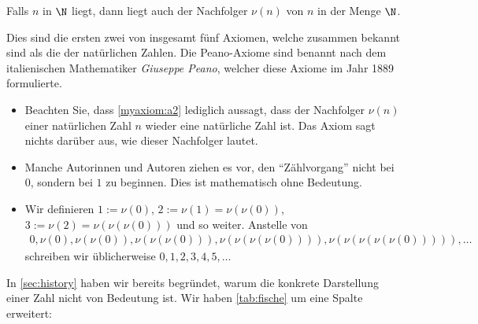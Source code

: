 \begin{myaxiom}\label{myaxiom:a2}
	Falls $n$ in $\N$ liegt, dann liegt auch der Nachfolger $\nu(n)$ von $n$ in der Menge $\N$.
\end{myaxiom}

\noindent
Dies sind die ersten zwei von insgesamt fünf Axiomen, welche zusammen bekannt sind als die  der natürlichen Zahlen. Die Peano-Axiome sind benannt nach dem italienischen Mathematiker \textit{Giuseppe Peano}, welcher diese Axiome im Jahr 1889 formulierte.

\begin{myremark}
  \leavevmode
	\begin{itemize}
		\item Beachten Sie, dass \cref{myaxiom:a2} lediglich aussagt, dass der Nachfolger $\nu(n)$ einer natürlichen Zahl $n$ wieder eine natürliche Zahl ist. Das Axiom sagt nichts darüber aus, wie dieser Nachfolger lautet.
		\item Manche Autorinnen und Autoren ziehen es vor, den \enquote{Zählvorgang} nicht bei $0$, sondern bei $1$ zu beginnen. Dies ist mathematisch ohne Bedeutung. \cite{AmannEscher1}
		\item Wir definieren $1:=\nu(0)$, $2:=\nu(1)=\nu(\nu(0))$, $3:=\nu(2)=\nu(\nu(\nu(0)))$ und so weiter. Anstelle von
		      \begin{align*}
			      0, \nu(0), \nu(\nu(0)), \nu(\nu(\nu(0))), \nu(\nu(\nu(\nu(0)))), \nu(\nu(\nu(\nu(\nu(0))))), \ldots
		      \end{align*}
		      schreiben wir üblicherweise $0, 1, 2, 3, 4, 5, \ldots$
	\end{itemize}
\end{myremark}
\clearpage
In \cref{sec:history} haben wir bereits begründet, warum die konkrete Darstellung einer Zahl nicht von Bedeutung ist. Wir haben \cref{tab:fische} um eine Spalte erweitert:
